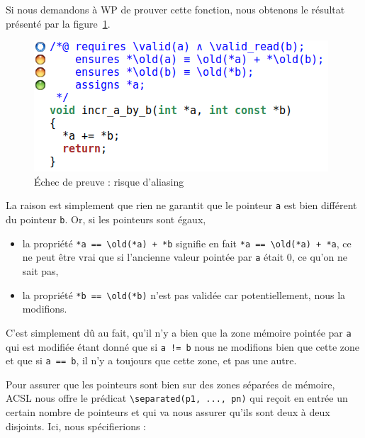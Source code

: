 \documentclass[12pt,francais,]{scrbook}
\providecommand{\tightlist}{%
  \setlength{\itemsep}{0pt}\setlength{\parskip}{0pt}}
\newenvironment{zdsexampleblock}[1]{%
  \tcolorbox[beamer,%
    noparskip,breakable,
    colback=LightGreen,colframe=DarkGreen,%
    colbacklower=LimeGreen,%
    title=#1]
}{\endtcolorbox}
\begin{document}
Si nous demandons à WP de prouver cette fonction, nous obtenons le
résultat présenté par la figure~\ref{fig:2-2-2-incr_a_by_b-1}.

\begin{figure}[htbp]
\centering
\includegraphics[scale=0.5]{2-2-2-incr_a_by_b-1.png}
\caption{Échec de preuve : risque d'aliasing}
\label{fig:2-2-2-incr_a_by_b-1}
\end{figure}

La raison est simplement que rien ne garantit que le pointeur \texttt{a}
est bien différent du pointeur \texttt{b}. Or, si les pointeurs sont
égaux,

\begin{itemize}
\tightlist
\item
  la propriété \texttt{*a\ ==\ \textbackslash{}old(*a)\ +\ *b} signifie
  en fait \texttt{*a\ ==\ \textbackslash{}old(*a)\ +\ *a}, ce ne peut
  être vrai que si l'ancienne valeur pointée par \texttt{a} était 0, ce
  qu'on ne sait pas,
\item
  la propriété \texttt{*b\ ==\ \textbackslash{}old(*b)} n'est pas
  validée car potentiellement, nous la modifions.
\end{itemize}

\begin{zdsexampleblock}{Pourquoi la clause assign est-elle validée ?}
  C'est simplement dû au fait, qu'il n'y a
  bien que la zone mémoire pointée par \texttt{a} qui est
  modifiée étant donné que si \texttt{a\ !=\ b} nous ne modifions bien
  que cette zone et que si \texttt{a\ ==\ b}, il n'y a toujours
  que cette zone, et pas une autre.
\end{zdsexampleblock}
  
Pour assurer que les pointeurs sont bien sur des zones séparées de
mémoire, ACSL nous offre le prédicat
\texttt{\textbackslash{}separated(p1,\ ...,\ pn)} qui reçoit en entrée
un certain nombre de pointeurs et qui va nous assurer qu'ils sont deux à
deux disjoints. Ici, nous spécifierions :
\end{document}
